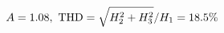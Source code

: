 \documentclass[preview]{standalone}
\begin{document}
\begin{align*}
\special{dvisvgm:raw <g id='unique000'>}A=1.08,\ \text{THD}=\sqrt{H_2^2+H_3^2}/H_1=18.5\%\special{dvisvgm:raw </g>}
\end{align*}
\end{document}
